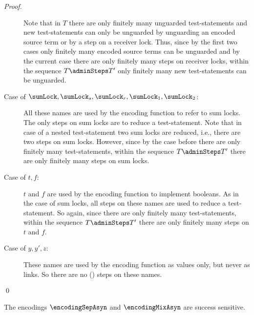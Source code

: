 \documentclass[]{llncs}
\begin{document}
\begin{proof}
\begin{description}
			Note that in $ T $ there are only finitely many unguarded test-statements and new test-statements can only be unguarded by unguarding an encoded source term or by a step on a receiver lock. Thus, since by the first two cases only finitely many encoded source terms can be unguarded and by the current case there are only finitely many steps on receiver locks, within the sequence $ T \adminSteps T' $ only finitely many new test-statements can be unguarded.
		\item[Case of $ \sumLock, \sumLock_s, \sumLock_r, \sumLock_1, \sumLock_2 $:] All these names are used by the encoding function to refer to sum locks. The only steps on sum locks are to reduce a test-statement. Note that in case of a nested test-statement two sum locks are reduced, i.e., there are two steps on sum locks. However, since by the case before there are only finitely many test-statements, within the sequence $ T \adminSteps T' $ there are only finitely many steps on sum locks.
		\item[Case of $ t, f $:] $ t $ and $ f $ are used by the encoding function to implement booleans. As in the case of sum locks, all steps on these names are used to reduce a test-statement. So again, since there are only finitely many test-statements, within the sequence $ T \adminSteps T' $ there are only finitely many steps on $ t $ and $ f $.
		\item[Case of $ y, y', z $:] These names are used by the encoding function as values only, but never as links. So there are no (\admin) steps on these names.
	\end{description}
	\qed
\end{proof}

\begin{lemma} \label{lem:successSensitiveness}
	The encodings $ \encodingSepAsyn $ and $ \encodingMixAsyn $ are success sensitive.
\end{lemma}
\end{document}
